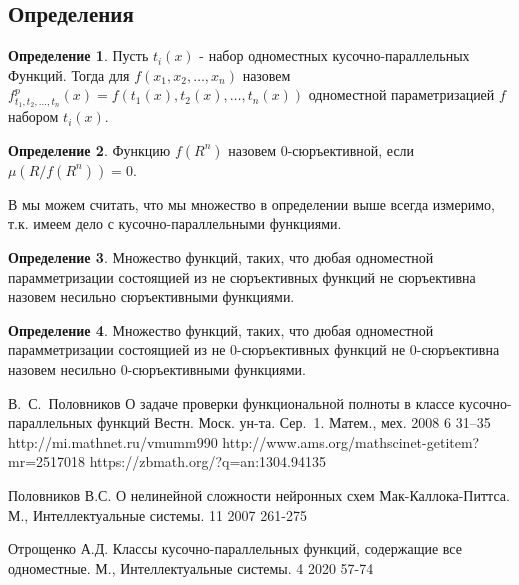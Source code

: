 \documentclass[a4paper]{article}
\theoremstyle{plain}
\theoremstyle{definition}
\newtheorem{definition}{Определение}
\begin{document}
\subsection{Определения}
  \begin{definition}
    Пусть $t_i(x)$ - набор одноместных кусочно-параллельных Функций. 
    Тогда для $f(x_1, x_2, \ldots, x_n)$ назовем $f^{p}_{t_1, t_2, \ldots, t_n}(x) = f(t_1(x), t_2(x), \ldots, t_n(x))$
    одноместной параметризацией $f$ набором $t_i(x)$.
  \end{definition}
  \begin{definition}
    Функцию $f(R^n)$ назовем 0-сюръективной, если $\mu(R / f(R^n)) = 0$.
  \end{definition}
      В мы можем считать, что мы множество в определении выше всегда измеримо, т.к. имеем дело с кусочно-параллельными функциями.
  \begin{definition}
  Множество функций, таких, что дюбая одноместной парамметризации состоящией из не сюръективных функций не сюръективна назовем несильно сюръективными функциями.
  \end{definition}
  \begin{definition}
  Множество функций, таких, что дюбая одноместной парамметризации состоящией из не 0-сюръективных функций не 0-сюръективна назовем несильно 0-сюръективными функциями.
  \end{definition}



\begin{thebibliography}{99}

  В.~С.~Половников
   О задаче проверки функциональной полноты в классе кусочно-параллельных функций
   Вестн. Моск. ун-та. Сер.~1. Матем., мех.
   2008
   6
   31--35
  {http://mi.mathnet.ru/vmumm990}
  {http://www.ams.org/mathscinet-getitem?mr=2517018}
  {https://zbmath.org/?q=an:1304.94135}

  Половников В.С.
  О нелинейной сложности нейронных схем Мак-Каллока-Питтса.
   М., Интеллектуальные системы.
   11
   2007
   261-275

   Отрощенко А.Д.
   Классы кусочно-параллельных функций, содержащие все одноместные.
    М., Интеллектуальные системы.
   4
   2020
   57-74

\end{thebibliography}
\end{document}
